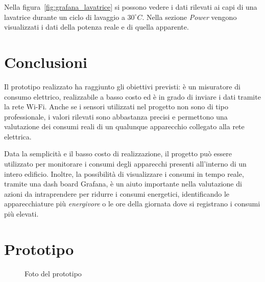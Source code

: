 \documentclass[italian,12pt,a4paper,oneside,final]{report}
\begin{document}
Nella figura~\ref{fig:grafana_lavatrice} si possono vedere i dati rilevati ai capi di una lavatrice durante un ciclo di lavaggio a $30^\circ C$.
Nella sezione \textit{Power} vengono visualizzati i dati della potenza reale e di quella apparente.


\section{Conclusioni}
Il prototipo realizzato ha raggiunto gli obiettivi previsti: è un misuratore di consumo elettrico, realizzabile a basso costo ed è in grado di inviare i dati tramite la rete Wi-Fi.
Anche se i sensori utilizzati nel progetto non sono di tipo professionale, i valori rilevati sono abbastanza precisi e permettono una valutazione dei consumi reali di un qualunque apparecchio collegato alla rete elettrica.

Data la semplicità e il basso costo di realizzazione, il progetto può essere utilizzato per monitorare i consumi degli apparecchi presenti all'interno di un intero edificio.
Inoltre, la possibilità di visualizzare i consumi in tempo reale, tramite una dash board Grafana, è un aiuto importante nella valutazione di azioni da intraprendere per ridurre i consumi energetici, identificando le apparecchiature più \textit{energivore} o le ore della giornata dove si registrano i consumi più elevati.

\appendices
{}

\section{Prototipo}

\begin{figure}[ht]
	\caption{Foto del prototipo}
	\label{fig:prototipo}
\end{figure}
\end{document}
